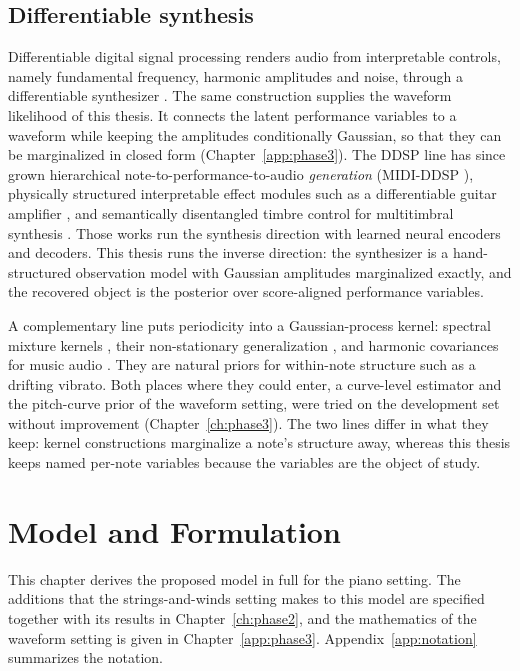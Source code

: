 \documentclass[11pt,a4paper]{report}
\begin{document}
\section{Differentiable synthesis}
Differentiable digital signal processing renders audio from interpretable
controls, namely fundamental frequency, harmonic amplitudes and noise,
through a differentiable synthesizer \cite{ddsp}. The same construction
supplies the waveform likelihood of this thesis. It connects the latent performance
variables to a waveform while keeping the amplitudes conditionally
Gaussian, so that they can be marginalized in closed form
(Chapter~\ref{app:phase3}). The DDSP line has since grown hierarchical
note-to-performance-to-audio \emph{generation} (MIDI-DDSP
\cite{wu2022midi}), physically structured interpretable effect modules such
as a differentiable guitar amplifier \cite{yeh2024ddspamp}, and semantically
disentangled timbre control for multitimbral synthesis \cite{dalri2026}.
Those works run the synthesis direction with learned neural encoders and
decoders. This thesis runs the inverse direction: the synthesizer is a
hand-structured observation model with Gaussian amplitudes marginalized
exactly, and the recovered object is the posterior over score-aligned
performance variables.

A complementary line puts periodicity into a Gaussian-process kernel:
spectral mixture kernels \cite{wilson2013}, their non-stationary
generalization \cite{remes2017}, and harmonic covariances for music audio
\cite{alvarado2016}. They are natural priors for within-note structure such
as a drifting vibrato. Both places where they could enter, a curve-level
estimator and the pitch-curve prior of the waveform setting, were tried on
the development set without improvement (Chapter~\ref{ch:phase3}). The two
lines differ in what they keep: kernel constructions marginalize a note's
structure away, whereas this thesis keeps named per-note variables because
the variables are the object of study.


\chapter{Model and Formulation}\label{ch:model}
This chapter derives the proposed model in full for the piano setting. The
additions that the strings-and-winds setting makes to this model are specified
together with its results in Chapter~\ref{ch:phase2}, and the mathematics of
the waveform setting is given in Chapter~\ref{app:phase3}.
Appendix~\ref{app:notation} summarizes the notation.
\end{document}
